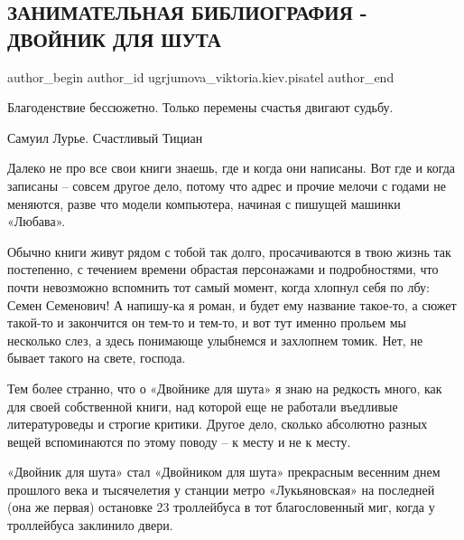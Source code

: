  
 
 
 
 
\subsection{ЗАНИМАТЕЛЬНАЯ БИБЛИОГРАФИЯ - ДВОЙНИК ДЛЯ ШУТА}
\label{sec:19_11_2018.lj.ugryumova.1.dvojnik_dlja_shuta}

\ifcmt
 author_begin
   author_id ugrjumova_viktoria.kiev.pisatel
 author_end
\fi

Благоденствие бессюжетно. Только перемены счастья двигают судьбу.

Самуил Лурье. Счастливый Тициан

Далеко не про все свои книги знаешь, где и когда они написаны. Вот где и когда
записаны – совсем другое дело, потому что адрес и прочие мелочи с годами не
меняются, разве что модели компьютера, начиная с пишущей машинки «Любава».

Обычно книги живут рядом с тобой так долго, просачиваются в твою жизнь так
постепенно, с течением времени обрастая персонажами и подробностями, что почти
невозможно вспомнить тот самый момент, когда хлопнул себя по лбу: Семен
Семенович! А напишу-ка я роман, и будет ему название такое-то, а сюжет такой-то
и закончится он тем-то и тем-то, и вот тут именно прольем мы несколько слез, а
здесь понимающе улыбнемся и захлопнем томик. Нет, не бывает такого на свете,
господа.


Тем более странно, что о «Двойнике для шута» я знаю на редкость много, как для
своей собственной книги, над которой еще не работали въедливые литературоведы и
строгие критики. Другое дело,  сколько абсолютно разных вещей вспоминаются по
этому поводу – к месту и не к месту.

«Двойник для шута» стал «Двойником для шута» прекрасным весенним днем прошлого
века и тысячелетия у станции метро «Лукьяновская» на последней (она же первая)
остановке 23 троллейбуса в тот благословенный миг, когда у троллейбуса
заклинило двери.

